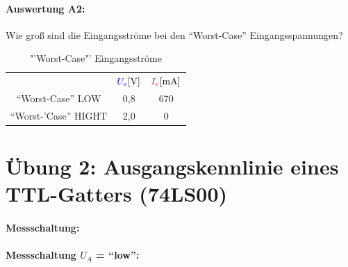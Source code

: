 \documentclass[a4paper,titlepage,parskip]{scrreprt}
\newcommand{\spannung}[1]{\textcolor{blue}{#1}}
\newcommand{\strom}[1]{\textcolor{red}{#1}}
\begin{document}
        \paragraph{Auswertung A2:} Wie groß sind die Eingangsströme bei den "`Worst-Case"' Eingangsspannungen?

          \begin{center}
            \begin{table}[!hbtp]
              \caption{"'Worst-Case"' Eingangsströme}
              \renewcommand{\arraystretch}{1.3}
              \begin{center}
                \begin{tabular}{c|cc}
                  &$\spannung{U_e} [\si{\volt}]$ & $\strom{I_e} [\si{\milli\ampere}]$\\
                  "`Worst-Case"' LOW & 0,8 & 670\\
                  "`Worst-'Case"' HIGHT& 2,0 & 0\\
                \end{tabular}
              \end{center}
            \end{table}
          \end{center}

    \section{Übung 2: Ausgangskennlinie eines TTL-Gatters (74LS00)}
      \paragraph{Messschaltung:}
      \paragraph{Messschaltung $U_A$ = "`low"':}
\end{document}

